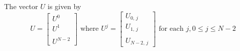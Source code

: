 The vector $U$ is given by 
\[U = \begin{bmatrix} U^0 \\ U^1 \\ \\ U^{N-2} \end{bmatrix} \text{ where } U^j = 
\begin{bmatrix} U_{0,\,j} \\ U_{1,\,j} \\ \\ U_{N-2,\,j} \end{bmatrix} \text{ for each } j, 0\leq j \leq N-2\]



